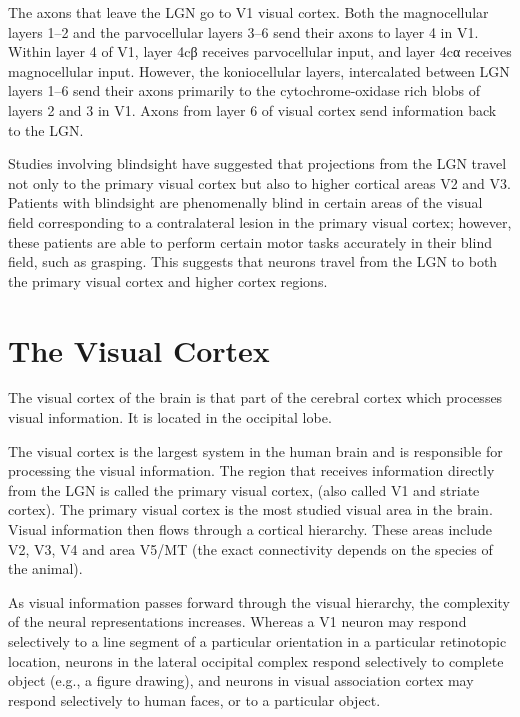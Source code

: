 The axons that leave the LGN go to V1 visual cortex. Both the magnocellular layers 1--2 and the parvocellular layers 3--6 send their axons to layer 4 in V1. Within layer 4 of V1, layer 4cβ receives parvocellular input, and layer 4cα receives magnocellular input. However, the koniocellular layers, intercalated between LGN layers 1--6 send their axons primarily to the cytochrome-oxidase rich blobs of layers 2 and 3 in V1. Axons from layer 6 of visual cortex send information back to the LGN.

Studies involving blindsight have suggested that projections from the LGN travel not only to the primary visual cortex but also to higher cortical areas V2 and V3. Patients with blindsight are phenomenally blind in certain areas of the visual field corresponding to a contralateral lesion in the primary visual cortex; however, these patients are able to perform certain motor tasks accurately in their blind field, such as grasping. This suggests that neurons travel from the LGN to both the primary visual cortex and higher cortex regions.

\hypertarget{the-visual-cortex}{%
\section{The Visual Cortex}\label{the-visual-cortex}}

The visual cortex of the brain is that part of the cerebral cortex which processes visual information. It is located in the occipital lobe.

The visual cortex is the largest system in the human brain and is responsible for processing the visual information. The region that receives information directly from the LGN is called the primary visual cortex, (also called V1 and striate cortex). The primary visual cortex is the most studied visual area in the brain. Visual information then flows through a cortical hierarchy. These areas include V2, V3, V4 and area V5/MT (the exact connectivity depends on the species of the animal).

As visual information passes forward through the visual hierarchy, the complexity of the neural representations increases. Whereas a V1 neuron may respond selectively to a line segment of a particular orientation in a particular retinotopic location, neurons in the lateral occipital complex respond selectively to complete object (e.g., a figure drawing), and neurons in visual association cortex may respond selectively to human faces, or to a particular object.

